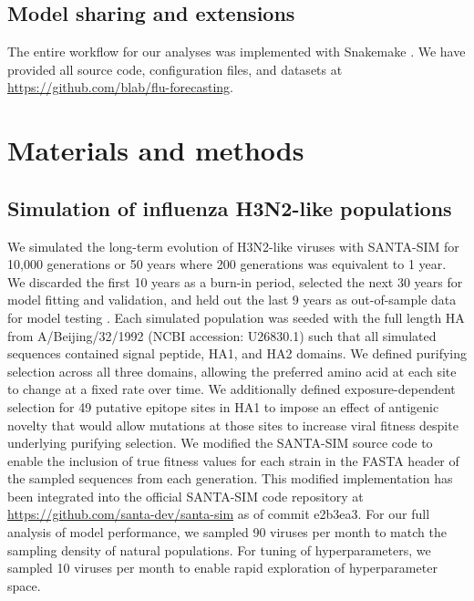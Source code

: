 \documentclass[9pt,lineno]{elife} %
\providecommand{\DIFadd}[1]{{\protect\color{blue}\uwave{#1}}} %
\providecommand{\DIFaddbegin}{} %
\providecommand{\DIFaddend}{} %
\providecommand{\DIFdelbegin}{} %
\providecommand{\DIFdelend}{} %
\providecommand{\DIFaddtex}[1]{{\protect\color{blue}\uwave{#1}}} %
\providecommand{\DIFaddbegin}{} %
\providecommand{\DIFaddend}{} %
\providecommand{\DIFdelbegin}{} %
\providecommand{\DIFdelend}{} %
\providecommand{\DIFadd}[1]{\texorpdfstring{\DIFaddtex{#1}}{#1}} %
\newcommand{\DIFscaledelfig}{0.5}
\newlength{\DIFdelgraphicswidth} %
\newlength{\DIFdelgraphicsheight} %
\newcommand{\DIFaddincludegraphics}[2][]{{\color{blue}\fbox{\DIFOincludegraphics[#1]{#2}}}} %
\newcommand{\DIFdelincludegraphics}[2][]{%
\sbox{\DIFdelgraphicsbox}{\DIFOincludegraphics[#1]{#2}}%
\settoboxwidth{\DIFdelgraphicswidth}{\DIFdelgraphicsbox} %
\settoboxtotalheight{\DIFdelgraphicsheight}{\DIFdelgraphicsbox} %
\scalebox{\DIFscaledelfig}{%
\parbox[b]{\DIFdelgraphicswidth}{\usebox{\DIFdelgraphicsbox}\\[-\baselineskip] \rule{\DIFdelgraphicswidth}{0em}}\llap{\resizebox{\DIFdelgraphicswidth}{\DIFdelgraphicsheight}{%
\setlength{\unitlength}{\DIFdelgraphicswidth}%
\begin{picture}(1,1)%
\thicklines\linethickness{2pt} %
{\color[rgb]{1,0,0}\put(0,0){\framebox(1,1){}}}%
{\color[rgb]{1,0,0}\put(0,0){\line( 1,1){1}}}%
{\color[rgb]{1,0,0}\put(0,1){\line(1,-1){1}}}%
\end{picture}%
}\hspace*{3pt}}} %
} %
\DeclareRobustCommand{\DIFaddbegin}{\DIFOaddbegin \let\includegraphics\DIFaddincludegraphics} %
\DeclareRobustCommand{\DIFaddend}{\DIFOaddend \let\includegraphics\DIFOincludegraphics} %
\DeclareRobustCommand{\DIFdelbegin}{\DIFOdelbegin \let\includegraphics\DIFdelincludegraphics} %
\DeclareRobustCommand{\DIFdelend}{\DIFOaddend \let\includegraphics\DIFOincludegraphics} %
\begin{document}
\subsection*{Model sharing and extensions}

The entire workflow for our analyses was implemented with Snakemake \DIFdelbegin %
\DIFdelend \DIFaddbegin \citep{Snakemake}\DIFaddend .
We have provided all source code, configuration files, and datasets at \href{https://github.com/blab/flu-forecasting}{https://github.com/blab/flu-forecasting}.

\section*{Materials and methods}

\subsection*{Simulation of influenza H3N2-like populations}

We simulated the long-term evolution of H3N2-like viruses with SANTA-SIM \DIFdelbegin %
\DIFdelend \DIFaddbegin \citep{Jariani2019} \DIFaddend for 10,000 generations or 50 years where 200 generations was equivalent to 1 year.
We discarded the first 10 years as a burn-in period, selected the next 30 years for model fitting and validation, and held out the last 9 years as out-of-sample data for model testing \DIFaddbegin \DIFadd{(Figure~\ref{fig:cross_validation_for_simulated_populations})}\DIFaddend .
Each simulated population was seeded with the full length HA from A/Beijing/32/1992 (NCBI accession: U26830.1) such that all simulated sequences contained signal peptide, HA1, and HA2 domains.
We defined purifying selection across all three domains, allowing the preferred amino acid at each site to change at a fixed rate over time.
We additionally defined exposure-dependent selection for 49 putative epitope sites in HA1 \DIFdelbegin %
\DIFdelend \DIFaddbegin \citep{Luksza:2014hj} \DIFaddend to impose an effect of antigenic novelty that would allow mutations at those sites to increase viral fitness despite underlying purifying selection.
We modified the SANTA-SIM source code to enable the inclusion of true fitness values for each strain in the FASTA header of the sampled sequences from each generation.
This modified implementation has been integrated into the official SANTA-SIM code repository at \url{https://github.com/santa-dev/santa-sim} as of commit e2b3ea3.
For our full analysis of model performance, we sampled 90 viruses per month to match the sampling density of natural populations.
For tuning of hyperparameters, we sampled 10 viruses per month to enable rapid exploration of hyperparameter space.
\end{document}
